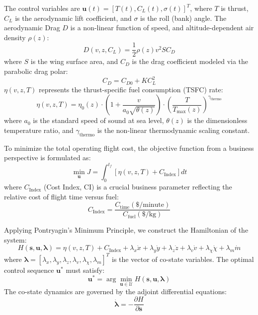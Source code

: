 \documentclass[11pt,a4paper]{book}
\begin{document}
The control variables are $\mathbf{u}(t) = [T(t), C_L(t), \sigma(t)]^T$, where $T$ is thrust, $C_L$ is the aerodynamic lift coefficient, and $\sigma$ is the roll (bank) angle.
The aerodynamic Drag $D$ is a non-linear function of speed, and altitude-dependent air density $\rho(z)$:
\begin{equation}
D(v, z, C_L) = \frac{1}{2} \rho(z) v^2 S C_D
\end{equation}
where $S$ is the wing surface area, and $C_D$ is the drag coefficient modeled via the parabolic drag polar:
\begin{equation}
C_D = C_{D0} + K C_L^2
\end{equation}
$\eta(v, z, T)$ represents the thrust-specific fuel consumption (TSFC) rate:
\begin{equation}
\eta(v, z, T) = \eta_{0}(z) \cdot \left( 1 + \frac{v}{a_0 \sqrt{\theta(z)}} \right) \cdot \left( \frac{T}{T_{\text{max}}(z)} \right)^{\gamma_{\text{thermo}}}
\end{equation}
where $a_0$ is the standard speed of sound at sea level, $\theta(z)$ is the dimensionless temperature ratio, and $\gamma_{\text{thermo}}$ is the non-linear thermodynamic scaling constant.

To minimize the total operating flight cost, the objective function from a business perspective is formulated as:
\begin{equation}
\min_{\mathbf{u}} J = \int_{0}^{t_f} \left[ \eta(v, z, T) + C_{\text{Index}} \right] dt
\end{equation}
where $C_{\text{Index}}$ (Cost Index, CI) is a crucial business parameter reflecting the relative cost of flight time versus fuel:
\begin{equation}
C_{\text{Index}} = \frac{C_{\text{time}} (\$/\text{minute})}{C_{\text{fuel}} (\$/\text{kg})}
\end{equation}

Applying Pontryagin's Minimum Principle, we construct the Hamiltonian of the system:
\begin{equation}
H(\mathbf{s}, \mathbf{u}, \boldsymbol{\lambda}) = \eta(v, z, T) + C_{\text{Index}} + \lambda_x \dot{x} + \lambda_y \dot{y} + \lambda_z \dot{z} + \lambda_v \dot{v} + \lambda_\chi \dot{\chi} + \lambda_m \dot{m}
\end{equation}
where $\boldsymbol{\lambda} = [\lambda_x, \lambda_y, \lambda_z, \lambda_v, \lambda_\chi, \lambda_m]^T$ is the vector of co-state variables. The optimal control sequence $\mathbf{u}^*$ must satisfy:
\begin{equation}
\mathbf{u}^* = \arg \min_{\mathbf{u} \in \mathcal{U}} H(\mathbf{s}, \mathbf{u}, \boldsymbol{\lambda})
\end{equation}
The co-state dynamics are governed by the adjoint differential equations:
\begin{equation}
\dot{\boldsymbol{\lambda}} = - \frac{\partial H}{\partial \mathbf{s}}
\end{equation}
\end{document}
